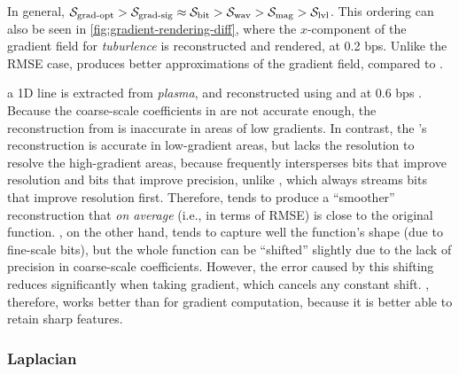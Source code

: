 In general,  $\sgop > \sgsg \approx \sbit
> \swav > \smag > \slvl$.  This ordering can also be seen in
\autoref{fig:gradient-rendering-diff}, where the $x$-component of the gradient
field for \emph{tuburlence} is reconstructed and rendered, at 0.2 bps. Unlike
the RMSE case, \sbit produces better approximations of the gradient field,
compared to \swav.

a 1D line is extracted from \emph{plasma}, and reconstructed using \sbit and
\swav at 0.6 bps .  Because the coarse-scale
coefficients in \sbit are not accurate enough, the reconstruction from \sbit is
inaccurate in areas of low gradients. In contrast, the \swav's reconstruction
is accurate in low-gradient areas, but lacks the resolution to resolve the
high-gradient areas,  because \swav frequently
intersperses bits that improve resolution and bits that improve precision,
unlike \sbit, which always streams bits that improve resolution first.
Therefore, \swav tends to produce a ``smoother'' reconstruction that \emph{on
average} (i.e., in terms of RMSE) is close to the original function.  \sbit, on
the other hand, tends to capture well the function's shape (due to fine-scale
bits), but the whole function can be ``shifted'' slightly due to the lack of
precision in coarse-scale coefficients. However, the error caused by this
shifting reduces significantly when taking gradient, which cancels any constant
shift. \sbit, therefore, works better than \swav for gradient computation,
because it is better able to retain sharp features.


\subsubsection{Laplacian } \label{sec:laplacian}

